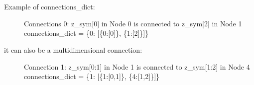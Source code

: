 \documentclass[letterpaper,10pt,english]{sphinxmanual}
\begin{document}
\begin{fulllineitems}
\label{\detokenize{yaocptool.modelling:yaocptool.modelling.network.Network}}~

\begin{fulllineitems}
\label{\detokenize{yaocptool.modelling:yaocptool.modelling.network.Network.__init__}}~\begin{description}
\item[{Example of connections\_dict:}] \leavevmode
Connections 0:
z\_sym{[}0{]} in Node 0 is connected to z\_sym{[}2{]} in Node 1
connections\_dict = \{0: {[}\{0:{[}0{]}\}, \{1:{[}2{]}\}{]}\}

\item[{it can also be a multidimensional connection:}] \leavevmode
Connection 1:
z\_sym{[}0:1{]} in Node 1 is connected to z\_sym{[}1:2{]} in Node 4
connections\_dict = \{1: {[}\{1:{[}0,1{]}\}, \{4:{[}1,2{]}\}{]}\}

\end{description}
\begin{quote}\begin{description}
\end{description}\end{quote}

\end{fulllineitems}


\begin{fulllineitems}
\label{\detokenize{yaocptool.modelling:yaocptool.modelling.network.Network.create_connections}}
\end{fulllineitems}


\begin{fulllineitems}
\label{\detokenize{yaocptool.modelling:yaocptool.modelling.network.Network.get_connection_defined_z}}
\end{fulllineitems}


\end{fulllineitems}
\end{document}
